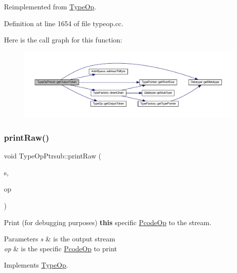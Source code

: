 Reimplemented from \mbox{\hyperlink{class_type_op_a7150ac93bb03a993735c829deb5237e7}{Type\+Op}}.



Definition at line 1654 of file typeop.\+cc.

Here is the call graph for this function\+:
\nopagebreak
\begin{figure}[H]
\begin{center}
\leavevmode
\includegraphics[width=350pt]{class_type_op_ptrsub_a1830a4ee48307559c378c4147aa19979_cgraph}
\end{center}
\end{figure}
\mbox{\label{class_type_op_ptrsub_a0431beebe1aed0f6b33abeee6c0a2a24}} 
\subsubsection{\texorpdfstring{printRaw()}{printRaw()}}
{\footnotesize\ttfamily void Type\+Op\+Ptrsub\+::print\+Raw (\begin{DoxyParamCaption}\item[{ostream \&}]{s,  }\item[{const \mbox{\hyperlink{class_pcode_op}{Pcode\+Op}} $\ast$}]{op }\end{DoxyParamCaption})\hspace{0.3cm}{\ttfamily [virtual]}}



Print (for debugging purposes) {\bfseries{this}} specific \mbox{\hyperlink{class_pcode_op}{Pcode\+Op}} to the stream. 


\begin{DoxyParams}{Parameters}
{\em s} & is the output stream \\
\hline
{\em op} & is the specific \mbox{\hyperlink{class_pcode_op}{Pcode\+Op}} to print \\
\hline
\end{DoxyParams}


Implements \mbox{\hyperlink{class_type_op_a60717e486917a30cc7cb6e3ce02585e1}{Type\+Op}}.



